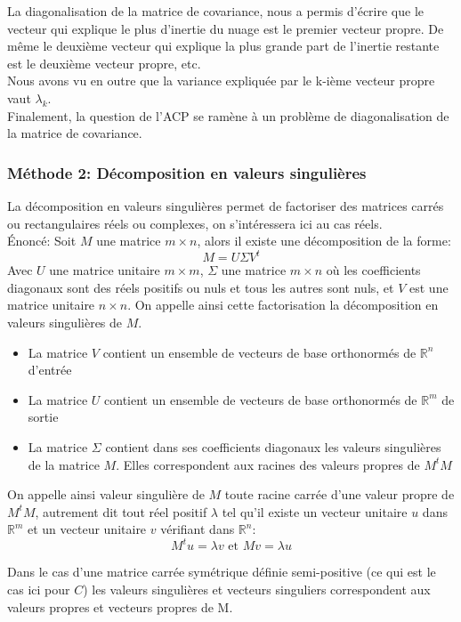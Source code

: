 \documentclass[12pt,french]{article}
\theoremstyle{plain}
\theoremstyle{definition}
\begin{document}
La diagonalisation de la matrice de covariance, nous a permis d'écrire que le vecteur qui explique le plus d'inertie du nuage est le premier vecteur propre.
De même le deuxième vecteur qui explique la plus grande part de l'inertie restante est le deuxième vecteur propre, etc.\\
Nous avons vu en outre que la variance expliquée par le k-ième vecteur propre vaut $\lambda_k$.\\
Finalement, la question de l'ACP se ramène à un problème de diagonalisation de la matrice de covariance.

\subsubsection{Méthode 2: Décomposition en valeurs singulières}

La décomposition en valeurs singulières permet de factoriser des matrices carrés ou rectangulaires réels ou complexes, on s'intéressera ici au cas réels. \\
Énoncé: Soit $M$ une matrice $m \times n$, alors il existe une décomposition de la forme: \\
$$M=U\Sigma V^t$$
Avec $U$ une matrice unitaire $m \times m$, $\Sigma$ une matrice $m\times n$ où les coefficients diagonaux sont des réels positifs ou nuls et tous les autres sont nuls, et $V$ est une matrice unitaire $n \times n$. On appelle ainsi cette factorisation la décomposition en valeurs singulières de $M$.
\begin{itemize}
\item La matrice $V$ contient un ensemble de vecteurs de base orthonormés de $\mathbb{R}^n$ d'entrée
\item La matrice $U$ contient un ensemble de vecteurs de base orthonormés de $\mathbb{R}^m$ de sortie
\item La matrice $\Sigma$ contient dans ses coefficients diagonaux les valeurs singulières de la matrice $M$. Elles correspondent aux racines des valeurs propres de $M^t M$
\end{itemize}

On appelle ainsi valeur singulière de $M$ toute racine carrée d'une valeur propre de $M^t M$, autrement dit tout réel positif $\lambda$ tel qu'il existe un vecteur unitaire $u$ dans $\mathbb{R}^m$ et un vecteur unitaire $v$ vérifiant dans $\mathbb{R}^n$:
$$ M^t u = \lambda v \text{ et } Mv = \lambda u$$

Dans le cas d'une matrice carrée symétrique définie semi-positive (ce qui est le cas ici pour $C$) les valeurs singulières et vecteurs singuliers correspondent aux valeurs propres et vecteurs propres de M.
\end{document}
